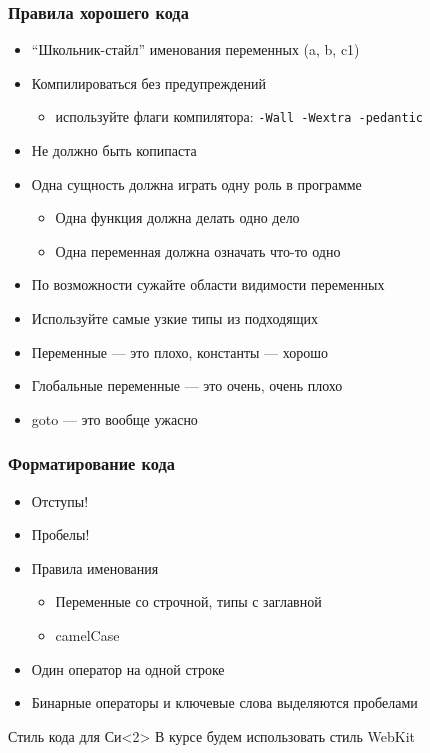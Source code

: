 \documentclass[aspectratio=169]{beamer}
\begin{document}
\begin{frame}
    \frametitle{Правила хорошего кода}

    \begin{itemize}
        \item \enquote{Школьник-стайл} именования переменных (a, b, c1)
        \item Компилироваться без предупреждений
              \begin{itemize}
                  \item используйте флаги компилятора: \texttt{-Wall -Wextra -pedantic}
              \end{itemize}
        \item Не должно быть копипаста
        \item Одна сущность должна играть одну роль в программе
              \begin{itemize}
                  \item Одна функция должна делать одно дело
                  \item Одна переменная должна означать что-то одно
              \end{itemize}
        \item По возможности сужайте области видимости переменных
        \item Используйте самые узкие типы из подходящих
        \item Переменные --- это плохо, константы --- хорошо
        \item Глобальные переменные --- это очень, очень плохо
        \item goto --- это вообще ужасно
    \end{itemize}

\end{frame}

\begin{frame}
    \frametitle{Форматирование кода}

    \begin{itemize}
        \item Отступы!
        \item Пробелы!
        \item Правила именования
              \begin{itemize}
                  \item Переменные со строчной, типы с заглавной
                  \item camelCase
              \end{itemize}
        \item Один оператор на одной строке%
        \item Бинарные операторы и ключевые слова выделяются пробелами
    \end{itemize}

    \begin{exampleblock}{Стиль кода для Си}<2>
        В курсе будем использовать стиль WebKit
    \end{exampleblock}
\end{frame}
\end{document}
